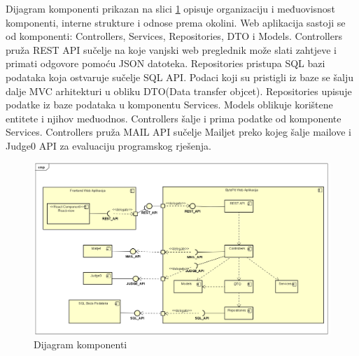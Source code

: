 Dijagram komponenti prikazan na slici \ref{fig:dijagramKomponenti} opisuje organizaciju i međuovisnost  komponenti, interne strukture i odnose prema okolini. Web aplikacija sastoji se od komponenti: Controllers, Services, Repositories, DTO i Models. Controllers pruža REST API sučelje na koje vanjski web preglednik može slati zahtjeve i primati odgovore pomoću JSON datoteka. Repositories pristupa SQL bazi podataka koja ostvaruje sučelje SQL API. Podaci koji su pristigli iz baze se šalju dalje MVC arhitekturi u obliku DTO(Data transfer objcet). Repositories upisuje podatke iz baze podataka u komponentu Services. Models oblikuje korištene entitete i njihov međuodnos. Controllers šalje i prima podatke od komponente Services. Controllers pruža MAIL API sučelje Mailjet preko kojeg šalje mailove i Judge0 API za evaluaciju programskog rješenja.
\\
\begin{figure}[H]
	\includegraphics[scale=0.5]{dijagrami/dijagramKomponenti.png}
	\centering
	\caption{Dijagram komponenti}
	\label{fig:dijagramKomponenti}
\end{figure}
%
%
